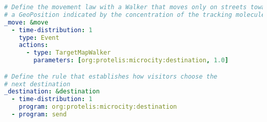\begin{lstlisting}[language=yaml, label=code:movement, caption=Define the movement behaviour for visitors.]
# Define the movement law with a Walker that moves only on streets towards
# a GeoPosition indicated by the concentration of the tracking molecule
_move: &move
  - time-distribution: 1
    type: Event
    actions:
      - type: TargetMapWalker
        parameters: [org:protelis:microcity:destination, 1.0]

# Define the rule that establishes how visitors choose the
# next destination
_destination: &destination
  - time-distribution: 1
    program: org:protelis:microcity:destination
  - program: send
\end{lstlisting}
